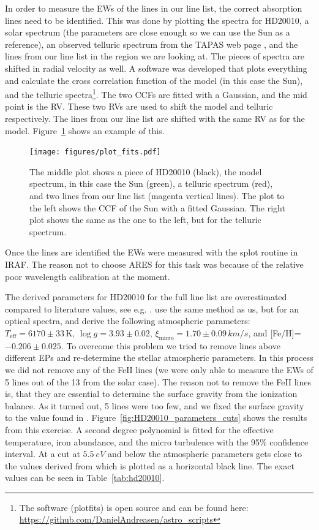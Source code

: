 \documentclass{aa}
\begin{document}
In order to measure the EWs of the lines in our line list, the correct
absorption lines need to be identified. This was done by plotting the
spectra for HD20010, a solar spectrum (the parameters are close enough
so we can use the Sun as a reference), an observed telluric spectrum
from the TAPAS web page \citep{Bertaux2014}, and the lines from our
line list in the region we are looking at. The pieces of spectra are
shifted in radial velocity as well. A software was developed that
plots everything and calculate the cross correlation function of the
model (in this case the Sun), and the telluric spectra\footnote{The
software (plot\textunderscore{}fits) is open source and can be found
here: \url{https://github.com/DanielAndreasen/astro_scripts}}. The two
CCFs are fitted with a Gaussian, and the mid point is the RV. These two
RVs are used to shift the model and telluric respectively. The lines
from our line list are shifted with the same RV as for the model.
Figure~\ref{fig:plot_fits} shows an example of this.

\begin{figure}[tbp!]
    \centering
    \texttt{[image: figures/plot\_fits.pdf]}
    \caption{The middle plot shows a piece of HD20010 (black), the model
    spectrum, in this case the Sun (green), a telluric spectrum (red), and two
    lines from our line list (magenta vertical lines). The plot to the left
    shows the CCF of the Sun with a fitted Gaussian. The right plot shows the
    same as the one to the left, but for the telluric spectrum.}
    \label{fig:plot_fits}
\end{figure}

Once the lines are identified the EWs were measured with the splot
routine in IRAF. The reason not to choose ARES for this task was because
of the relative poor wavelength calibration at the moment.

The derived parameters for HD20010 for the full line list
are overestimated compared to literature values, see e.g.
\citet{Mortier2013,Gonzalez2010}. \cite{Gonzalez2010} use the same
method as us, but for an optical spectra, and derive the following
atmospheric parameters: $T_\mathrm{eff}=6170\pm33\,\si{\kelvin}$,
$\log g=3.93\pm0.02$, $\xi_\mathrm{micro}=1.70\pm0.09\,\si{km/s}$,
and [Fe/H]=$-0.206\pm0.025$. To overcome this problem we tried
to remove lines above different EPs and re-determine the stellar
atmospheric parameters. In this process we did not remove any of the
FeII lines (we were only able to measure the EWs of 5 lines out of
the 13 from the solar case). The reason not to remove the FeII lines
is, that they are essential to determine the surface gravity from the
ionization balance. As it turned out, 5 lines were too few, and we
fixed the surface gravity to the value found in \cite{Gonzalez2010}.
Figure~\ref{fig:HD20010_parameters_cuts} shows the results from this
exercise. A second degree polynomial is fitted for the effective
temperature, iron abundance, and the micro turbulence with the
95\% confidence interval. At a cut at $\SI{5.5}{eV}$ and below
the atmospheric parameters gets close to the values derived from
\cite{Gonzalez2010} which is plotted as a horizontal black line. The
exact values can be seen in Table~\ref{tab:hd20010}.
\end{document}
